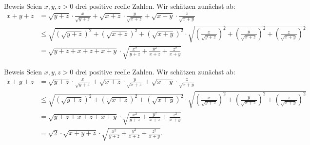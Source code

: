 \documentclass[10pt]{beamer}
\begin{document}
\begin{frame}{Beweis}
    Seien \( x, y, z > 0 \) drei positive reelle Zahlen. Wir schätzen zunächst ab:
    {\footnotesize
    \begin{align*}
        x + y + z
        & = \sqrt{y + z} \cdot \frac{x}{\sqrt{y + z}} + \sqrt{x + z} \cdot \frac{y}{\sqrt{x + z}} + \sqrt{x + y} \cdot \frac{z}{\sqrt{x + y}} \\
        & \leq \sqrt{\left( \sqrt{y + z} \right)^{2} + \left( \sqrt{x + z} \right)^{2} + \left( \sqrt{x + y} \right)^{2}} \cdot \sqrt{\left( \frac{x}{\sqrt{y + z}}\right)^{2} + \left( \frac{y}{\sqrt{x + z}}\right)^{2} + \left( \frac{z}{\sqrt{x + y}}\right)^{2}} \\
        & = \sqrt{y + z + x + z + x + y} \cdot \sqrt{\frac{x^{2}}{y + z} + \frac{y^{2}}{x + z} + \frac{z^{2}}{x + y}}
    \end{align*}
    }
\end{frame}



\begin{frame}{Beweis}
    Seien \( x, y, z > 0 \) drei positive reelle Zahlen. Wir schätzen zunächst ab:
    {\footnotesize
    \begin{align*}
        x + y + z
        & = \sqrt{y + z} \cdot \frac{x}{\sqrt{y + z}} + \sqrt{x + z} \cdot \frac{y}{\sqrt{x + z}} + \sqrt{x + y} \cdot \frac{z}{\sqrt{x + y}} \\
        & \leq \sqrt{\left( \sqrt{y + z} \right)^{2} + \left( \sqrt{x + z} \right)^{2} + \left( \sqrt{x + y} \right)^{2}} \cdot \sqrt{\left( \frac{x}{\sqrt{y + z}}\right)^{2} + \left( \frac{y}{\sqrt{x + z}}\right)^{2} + \left( \frac{z}{\sqrt{x + y}}\right)^{2}} \\
        & = \sqrt{y + z + x + z + x + y} \cdot \sqrt{\frac{x^{2}}{y + z} + \frac{y^{2}}{x + z} + \frac{z^{2}}{x + y}} \\
        & = \sqrt{2} \cdot \sqrt{x + y + z} \cdot \sqrt{\frac{x^{2}}{y + z} + \frac{y^{2}}{x + z} + \frac{z^{2}}{x + y}}.
    \end{align*}
    }
\end{frame}
\end{document}
